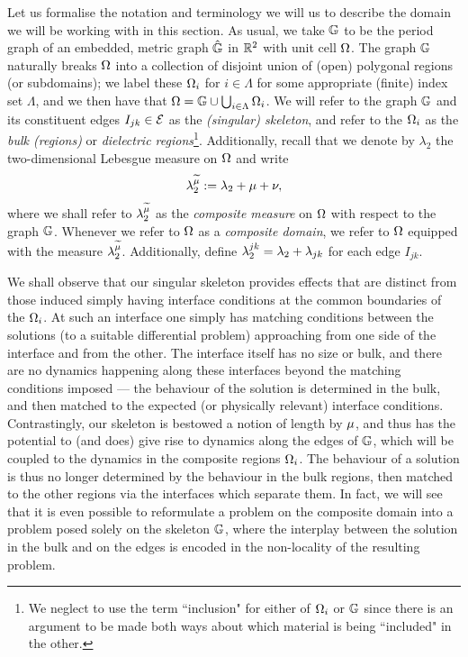 Let us formalise the notation and terminology we will us to describe the domain we will be working with in this section.
As usual, we take $\mathbb{G}$ to be the period graph of an embedded, metric graph $\hat{\mathbb{G}}$ in $\mathbb{R}^2$ with unit cell $\Omega$.
The graph $\mathbb{G}$ naturally breaks $\Omega$ into a collection of disjoint union of (open) polygonal regions (or subdomains); we label these $\Omega_i$ for $i\in\Lambda$ for some appropriate (finite) index set $\Lambda$, and we then have that $\Omega = \mathbb{G}\cup\bigcup_{i\in\Lambda}\Omega_i$.
We will refer to the graph $\mathbb{G}$ and its constituent edges $I_{jk}\in\mathcal{E}$ as the \emph{(singular) skeleton}, and refer to the $\Omega_i$ as the \emph{bulk (regions)} or \emph{dielectric regions}\footnote{We neglect to use the term ``inclusion" for either of $\Omega_i$ or $\mathbb{G}$ since there is an argument to be made both ways about which material is being ``included" in the other.}.
Additionally, recall that we denote by $\lambda_2$ the two-dimensional Lebesgue measure on $\Omega$ and write
\begin{align*}
	\lambda_2^{\widetilde{\mu}} := \lambda_2 + \mu + \nu,
\end{align*}
where we shall refer to $\lambda_2^{\widetilde{\mu}}$ as the \emph{composite measure} on $\Omega$ with respect to the graph $\mathbb{G}$.
Whenever we refer to $\Omega$ as a \emph{composite domain}, we refer to $\Omega$ equipped with the measure $\lambda_2^{\widetilde{\mu}}$.
Additionally, define $\lambda_2^{jk} = \lambda_2 + \lambda_{jk}$ for each edge $I_{jk}$.

We shall observe that our singular skeleton provides effects that are distinct from those induced simply having interface conditions at the common boundaries of the $\Omega_i$.
At such an interface one simply has matching conditions between the solutions (to a suitable differential problem) approaching from one side of the interface and from the other.
The interface itself has no size or bulk, and there are no dynamics happening along these interfaces beyond the matching conditions imposed --- the behaviour of the solution is determined in the bulk, and then matched to the expected (or physically relevant) interface conditions.
Contrastingly, our skeleton is bestowed a notion of length by $\mu$, and thus has the potential to (and does) give rise to dynamics along the edges of $\mathbb{G}$, which will be coupled to the dynamics in the composite regions $\Omega_i$.
The behaviour of a solution is thus no longer determined by the behaviour in the bulk regions, then matched to the other regions via the interfaces which separate them.
In fact, we will see that it is even possible to reformulate a problem on the composite domain into a problem posed solely on the skeleton $\mathbb{G}$, where the interplay between the solution in the bulk and on the edges is encoded in the non-locality of the resulting problem.

